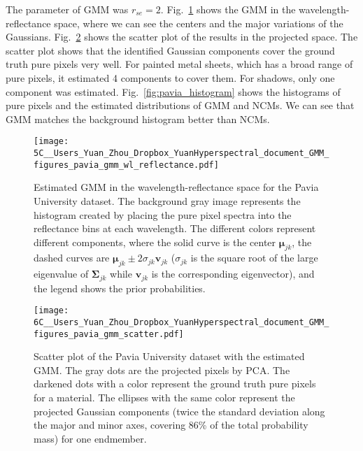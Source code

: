 \documentclass[twocolumn,english]{IEEEtran}
\theoremstyle{plain}
\begin{document}
The parameter of GMM was $r_{se}=2$. Fig.~\ref{fig:pavia_gmm_wl_reflectance}
shows the GMM in the wavelength-reflectance space, where we can see
the centers and the major variations of the Gaussians. Fig.~\ref{fig:pavia_gmm_scatter}
shows the scatter plot of the results in the projected space. The
scatter plot shows that the identified Gaussian components cover the
ground truth pure pixels very well. For painted metal sheets, which
has a broad range of pure pixels, it estimated 4 components to cover
them. For shadows, only one component was estimated. Fig.~\ref{fig:pavia_histogram}
shows the histograms of pure pixels and the estimated distributions
of GMM and NCMs. We can see that GMM matches the background histogram
better than NCMs.

\begin{figure}
\begin{centering}
\texttt{[image: 5C\_\_Users\_Yuan\_Zhou\_Dropbox\_YuanHyperspectral\_document\_GMM\_figures\_pavia\_gmm\_wl\_reflectance.pdf]}
\par\end{centering}
\caption{Estimated GMM in the wavelength-reflectance space for the Pavia University
dataset. The background gray image represents the histogram created
by placing the pure pixel spectra into the reflectance bins at each
wavelength. The different colors represent different components, where
the solid curve is the center $\boldsymbol{\mu}_{jk}$, the dashed
curves are $\boldsymbol{\mu}_{jk}\pm2\sigma_{jk}\mathbf{v}_{jk}$
($\sigma_{jk}$ is the square root of the large eigenvalue of $\boldsymbol{\Sigma}_{jk}$
while $\mathbf{v}_{jk}$ is the corresponding eigenvector), and the
legend shows the prior probabilities.}

\label{fig:pavia_gmm_wl_reflectance}
\end{figure}

\begin{figure}
\begin{centering}
\texttt{[image: 6C\_\_Users\_Yuan\_Zhou\_Dropbox\_YuanHyperspectral\_document\_GMM\_figures\_pavia\_gmm\_scatter.pdf]}
\par\end{centering}
\caption{Scatter plot of the Pavia University dataset with the estimated GMM.
The gray dots are the projected pixels by PCA. The darkened dots with
a color represent the ground truth pure pixels for a material. The
ellipses with the same color represent the projected Gaussian components
(twice the standard deviation along the major and minor axes, covering
86\% of the total probability mass) for one endmember.}

\label{fig:pavia_gmm_scatter}
\end{figure}
\end{document}
